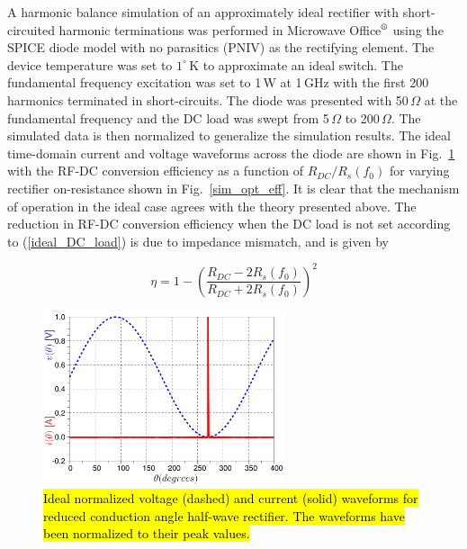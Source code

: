 A harmonic balance simulation of an approximately ideal rectifier with short-circuited harmonic terminations was performed in Microwave Office$\textsuperscript{\textregistered}$ using the SPICE diode model with no parasitics (PNIV) as the rectifying element.  The device temperature was set to $1^\circ$\,K to approximate an ideal switch.  The fundamental frequency excitation was set to 1\,W at 1\,GHz with the first 200 harmonics terminated in short-circuits.  The diode was presented with 50\,$\Omega$ at the fundamental frequency and the DC load was swept from 5\,$\Omega$ to 200\,$\Omega$.  The simulated data is then normalized to generalize the simulation results. The ideal time-domain current and voltage waveforms across the diode are shown in Fig.~\ref{waveforms} with the RF-DC conversion efficiency as a function of $R_{DC} / R_s(f_0)$ for varying rectifier on-resistance shown in Fig.~\ref{sim_opt_eff}.  It is clear that the mechanism of operation in the ideal case agrees with the theory presented above.  The reduction in RF-DC conversion efficiency when the DC load is not set according to (\ref{ideal_DC_load}) is due to impedance mismatch, and is given by


\begin{equation}\label{eff_dc_load}
\eta = 1 - \left(\frac{R_{DC} - 2R_s(f_0)}{R_{DC} + 2R_s(f_0)}\right)^2
\end{equation}

\begin{figure}
  \begin{center}
  \includegraphics[width=2.8in]{pdf/02.pdf}
  \caption{\hl{Ideal normalized voltage (dashed) and current (solid) waveforms for reduced conduction angle half-wave rectifier. The waveforms have been normalized to their peak values.}}\label{waveforms}
  \end{center}
\end{figure}

